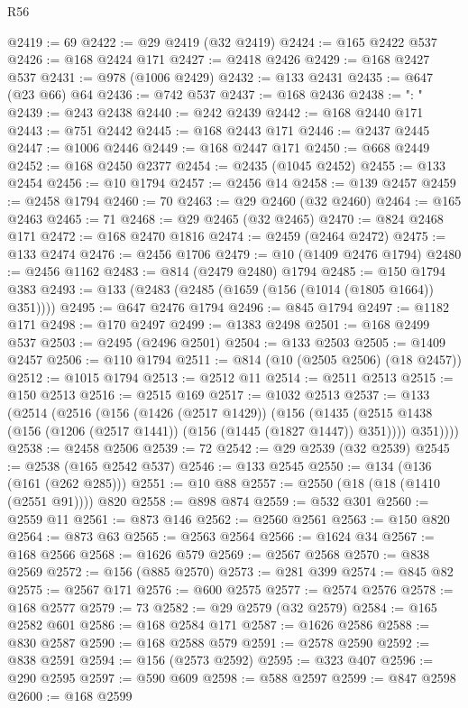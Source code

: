 \begin{lexlean}{R56}
\begin{coremodule}
@2419 := 69
@2422 := @29 @2419 (@32 @2419)
@2424 := @165 @2422 @537
@2426 := @168 @2424 @171
@2427 := @2418 @2426
@2429 := @168 @2427 @537
@2431 := @978 (@1006 @2429)
@2432 := @133 @2431
@2435 := @647 (@23 @66) @64
@2436 := @742 @537
@2437 := @168 @2436
@2438 := ": "
@2439 := @243 @2438
@2440 := @242 @2439
@2442 := @168 @2440 @171
@2443 := @751 @2442
@2445 := @168 @2443 @171
@2446 := @2437 @2445
@2447 := @1006 @2446
@2449 := @168 @2447 @171
@2450 := @668 @2449
@2452 := @168 @2450 @2377
@2454 := @2435 (@1045 @2452)
@2455 := @133 @2454
@2456 := @10 @1794
@2457 := @2456 @14
@2458 := @139 @2457
@2459 := @2458 @1794
@2460 := 70
@2463 := @29 @2460 (@32 @2460)
@2464 := @165 @2463
@2465 := 71
@2468 := @29 @2465 (@32 @2465)
@2470 := @824 @2468 @171
@2472 := @168 @2470 @1816
@2474 := @2459 (@2464 @2472)
@2475 := @133 @2474
@2476 := @2456 @1706
@2479 := @10 (@1409 @2476 @1794)
@2480 := @2456 @1162
@2483 := @814 (@2479 @2480) @1794
@2485 := @150 @1794 @383
@2493 := @133 (@2483 (@2485 (@1659 (@156 (@1014 (@1805 @1664)) @351))))
@2495 := @647 @2476 @1794
@2496 := @845 @1794
@2497 := @1182 @171
@2498 := @170 @2497
@2499 := @1383 @2498
@2501 := @168 @2499 @537
@2503 := @2495 (@2496 @2501)
@2504 := @133 @2503
@2505 := @1409 @2457
@2506 := @110 @1794
@2511 := @814 (@10 (@2505 @2506) (@18 @2457))
@2512 := @1015 @1794
@2513 := @2512 @11
@2514 := @2511 @2513
@2515 := @150 @2513
@2516 := @2515 @169
@2517 := @1032 @2513
@2537 := @133
    (@2514
      (@2516
        (@156
          (@1426 (@2517 @1429))
          (@156
            (@1435 (@2515 @1438 (@156 (@1206 (@2517 @1441)) (@156 (@1445 (@1827 @1447)) @351))))
            @351))))
@2538 := @2458 @2506
@2539 := 72
@2542 := @29 @2539 (@32 @2539)
@2545 := @2538 (@165 @2542 @537)
@2546 := @133 @2545
@2550 := @134 (@136 (@161 (@262 @285)))
@2551 := @10 @88
@2557 := @2550 (@18 (@18 (@1410 (@2551 @91)))) @820
@2558 := @898 @874
@2559 := @532 @301
@2560 := @2559 @11
@2561 := @873 @146
@2562 := @2560 @2561
@2563 := @150 @820
@2564 := @873 @63
@2565 := @2563 @2564
@2566 := @1624 @34
@2567 := @168 @2566
@2568 := @1626 @579
@2569 := @2567 @2568
@2570 := @838 @2569
@2572 := @156 (@885 @2570)
@2573 := @281 @399
@2574 := @845 @82
@2575 := @2567 @171
@2576 := @600 @2575
@2577 := @2574 @2576
@2578 := @168 @2577
@2579 := 73
@2582 := @29 @2579 (@32 @2579)
@2584 := @165 @2582 @601
@2586 := @168 @2584 @171
@2587 := @1626 @2586
@2588 := @830 @2587
@2590 := @168 @2588 @579
@2591 := @2578 @2590
@2592 := @838 @2591
@2594 := @156 (@2573 @2592)
@2595 := @323 @407
@2596 := @290 @2595
@2597 := @590 @609
@2598 := @588 @2597
@2599 := @847 @2598
@2600 := @168 @2599

\end{coremodule}
\end{lexlean}
